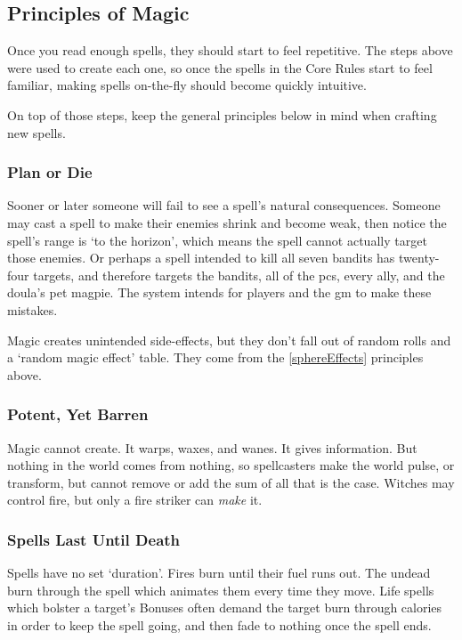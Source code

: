 \begin{multicols}{2}
\subsection{Principles of Magic}

Once you read enough spells, they should start to feel repetitive.
The steps above were used to create each one, so once the spells in the Core Rules start to feel familiar, making spells on-the-fly should become quickly intuitive.

On top of those steps, keep the general principles below in mind when crafting new spells.

\subsubsection{Plan or Die}

Sooner or later someone will fail to see a spell's natural consequences.
Someone may cast a spell to make their enemies shrink and become weak, then notice the spell's range is `to the horizon', which means the spell cannot actually target those enemies.
Or perhaps a spell intended to kill all seven bandits has twenty-four targets, and therefore targets the bandits, all of the \glspl{pc}, every ally, and the \gls{doula}'s pet magpie.
The system intends for players and the \gls{gm} to make these mistakes.

Magic creates unintended side-effects, but they don't fall out of random rolls and a `random magic effect' table.
They come from the \ref{sphereEffects} principles above.

\subsubsection{Potent, Yet Barren}

Magic cannot create.
It warps, waxes, and wanes.
It gives information.
But nothing in the world comes from nothing, so spellcasters make the world pulse, or transform, but cannot remove or add the sum of all that is the case.
Witches may control fire, but only a fire striker can \textit{make} it.

\subsubsection{Spells Last Until Death}

Spells have no set `duration'.
Fires burn until their fuel runs out.
The undead burn through the spell which animates them every time they move.
Life spells which bolster a target's Bonuses often demand the target burn through calories in order to keep the spell going, and then fade to nothing once the spell ends.


\end{multicols}
